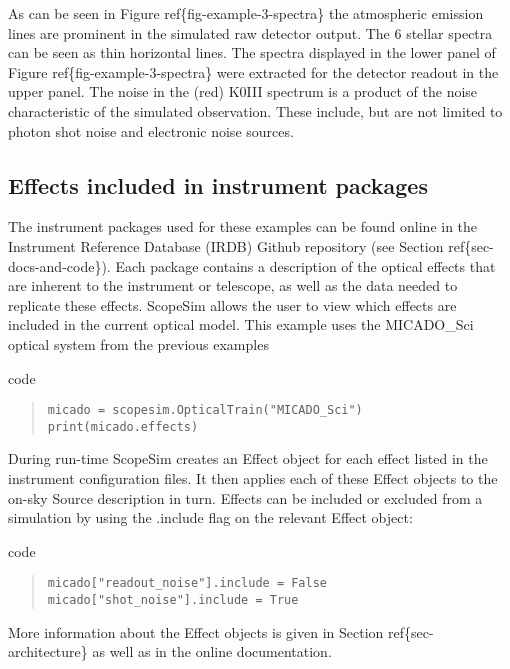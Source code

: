 As can be seen in Figure ref\{fig-example-3-spectra\} the atmospheric emission lines are prominent in the simulated raw detector output.
The 6 stellar spectra can be seen as thin horizontal lines.
The spectra displayed in the lower panel of Figure ref\{fig-example-3-spectra\} were extracted for the detector readout in the upper panel.
The noise in the (red) K0III spectrum is a product of the noise characteristic of the simulated observation.
These include, but are not limited to photon shot noise and electronic noise sources.


\subsection{Effects included in instrument packages%
  \label{effects-included-in-instrument-packages}%
}

The instrument packages used for these examples can be found online in the Instrument Reference Database (IRDB) Github repository (see Section ref\{sec-docs-and-code\}).
Each package contains a description of the optical effects that are inherent to the instrument or telescope, as well as the data needed to replicate these effects.
ScopeSim allows the user to view which effects are included in the current optical model.
This example uses the MICADO\_Sci optical system from the previous examples

\label{code-optical-train}
\begin{DUclass}{code}
\begin{quote}
\begin{alltt}
\begin{lstlisting}[frame=single]
micado = scopesim.OpticalTrain("MICADO_Sci")
print(micado.effects)
\end{lstlisting}
\end{alltt}
\end{quote}
\end{DUclass}

During run-time ScopeSim creates an Effect object for each effect listed in the instrument configuration files.
It then applies each of these Effect objects to the on-sky Source description in turn.
Effects can be included or excluded from a simulation by using the \textquotedbl{}.include\textquotedbl{} flag on the relevant Effect object:

\label{code-effects-on-off}
\begin{DUclass}{code}
\begin{quote}
\begin{alltt}
\begin{lstlisting}[frame=single]
micado["readout_noise"].include = False
micado["shot_noise"].include = True
\end{lstlisting}
\end{alltt}
\end{quote}
\end{DUclass}

More information about the Effect objects is given in Section ref\{sec-architecture\} as well as in the online documentation.
